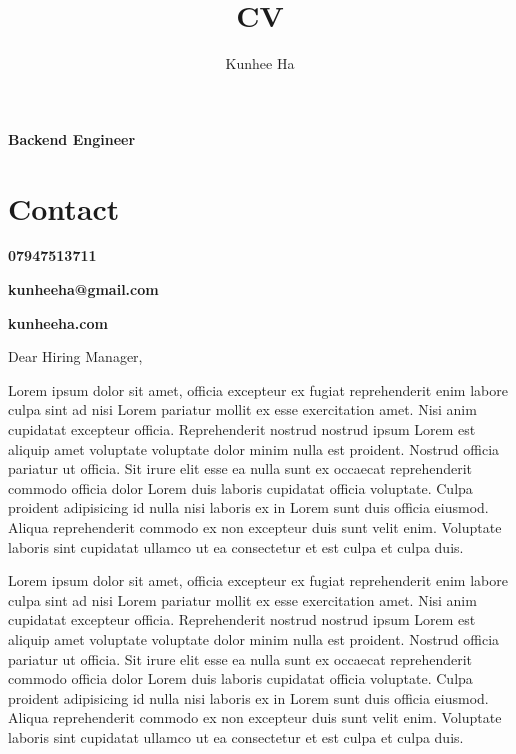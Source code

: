 \documentclass{article}
\renewcommand{\maketitle}{
  {\noindent\rmfamily\huge\bfseries\MakeUppercase\theauthor}

  {\color{black}\rmfamily\normalsize\bfseries{Backend Engineer}}
}
\newcommand{\contacts}[3]{
  {
    {\noindent\rmfamily\small\color{BodyGrey}\bfseries{\color{LightGrey}\faPhone}\hspace{3pt}#1}

    {\noindent\rmfamily\small\color{BodyGrey}\bfseries{\color{LightGrey}\faEnvelope}\hspace{3pt}#2}

    {\noindent\rmfamily\small\color{BodyGrey}\bfseries{\color{LightGrey}\faLink}\hspace{3pt}#3}

  }
}
\begin{document}
  \title{CV}
  \author{Kunhee Ha}
\begin{paracol}{2}
  \raggedright
  \maketitle

\section{Contact}

\contacts
  {07947513711}
  {kunheeha@gmail.com}
  {kunheeha.com}

  \switchcolumn
  \vspace{3pt}
\color{BodyGrey}
Dear Hiring Manager,
\vspace{15pt}

Lorem ipsum dolor sit amet, officia excepteur ex fugiat reprehenderit enim labore culpa sint ad nisi Lorem pariatur mollit ex esse exercitation amet. Nisi anim cupidatat excepteur officia. Reprehenderit nostrud nostrud ipsum Lorem est aliquip amet voluptate voluptate dolor minim nulla est proident. Nostrud officia pariatur ut officia. Sit irure elit esse ea nulla sunt ex occaecat reprehenderit commodo officia dolor Lorem duis laboris cupidatat officia voluptate. Culpa proident adipisicing id nulla nisi laboris ex in Lorem sunt duis officia eiusmod. Aliqua reprehenderit commodo ex non excepteur duis sunt velit enim. Voluptate laboris sint cupidatat ullamco ut ea consectetur et est culpa et culpa duis.
\vspace{15pt}


Lorem ipsum dolor sit amet, officia excepteur ex fugiat reprehenderit enim labore culpa sint ad nisi Lorem pariatur mollit ex esse exercitation amet. Nisi anim cupidatat excepteur officia. Reprehenderit nostrud nostrud ipsum Lorem est aliquip amet voluptate voluptate dolor minim nulla est proident. Nostrud officia pariatur ut officia. Sit irure elit esse ea nulla sunt ex occaecat reprehenderit commodo officia dolor Lorem duis laboris cupidatat officia voluptate. Culpa proident adipisicing id nulla nisi laboris ex in Lorem sunt duis officia eiusmod. Aliqua reprehenderit commodo ex non excepteur duis sunt velit enim. Voluptate laboris sint cupidatat ullamco ut ea consectetur et est culpa et culpa duis.
\vspace{15pt}



\end{paracol}
\end{document}
